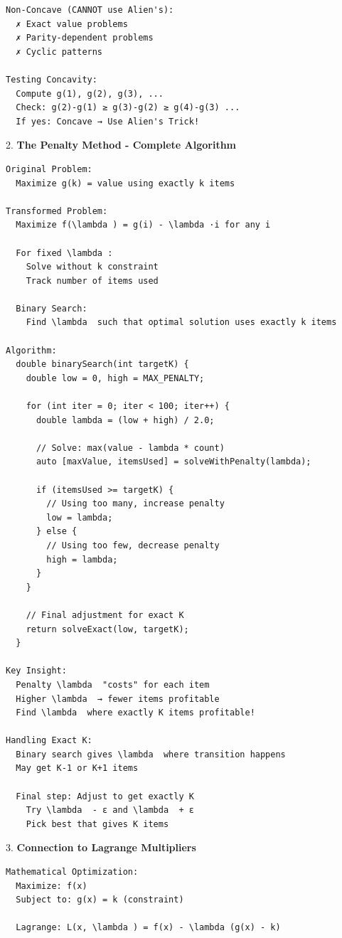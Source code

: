 \documentclass[11pt,a4paper,oneside]{book}
\begin{document}
\begin{tcolorbox}[
    enhanced,breakable,
    colback=white,
    colframe=deepblue,
    boxrule=1.5pt,
    arc=3mm,
    title=\textbf{The Ultimate DP Optimization}
]
\begin{verbatim}
Non-Concave (CANNOT use Alien's):
  ✗ Exact value problems
  ✗ Parity-dependent problems
  ✗ Cyclic patterns

Testing Concavity:
  Compute g(1), g(2), g(3), ...
  Check: g(2)-g(1) ≥ g(3)-g(2) ≥ g(4)-g(3) ...
  If yes: Concave → Use Alien's Trick!
\end{verbatim}

2. \textbf{The Penalty Method - Complete Algorithm}
\begin{verbatim}
Original Problem:
  Maximize g(k) = value using exactly k items

Transformed Problem:
  Maximize f(\lambda ) = g(i) - \lambda ·i for any i
  
  For fixed \lambda :
    Solve without k constraint
    Track number of items used
  
  Binary Search:
    Find \lambda  such that optimal solution uses exactly k items

Algorithm:
  double binarySearch(int targetK) {
    double low = 0, high = MAX_PENALTY;
    
    for (int iter = 0; iter < 100; iter++) {
      double lambda = (low + high) / 2.0;
      
      // Solve: max(value - lambda * count)
      auto [maxValue, itemsUsed] = solveWithPenalty(lambda);
      
      if (itemsUsed >= targetK) {
        // Using too many, increase penalty
        low = lambda;
      } else {
        // Using too few, decrease penalty
        high = lambda;
      }
    }
    
    // Final adjustment for exact K
    return solveExact(low, targetK);
  }

Key Insight:
  Penalty \lambda  "costs" for each item
  Higher \lambda  → fewer items profitable
  Find \lambda  where exactly K items profitable!

Handling Exact K:
  Binary search gives \lambda  where transition happens
  May get K-1 or K+1 items
  
  Final step: Adjust to get exactly K
    Try \lambda  - ε and \lambda  + ε
    Pick best that gives K items
\end{verbatim}

3. \textbf{Connection to Lagrange Multipliers}
\begin{verbatim}
Mathematical Optimization:
  Maximize: f(x)
  Subject to: g(x) = k (constraint)
  
  Lagrange: L(x, \lambda ) = f(x) - \lambda (g(x) - k)
  

\end{verbatim}
\end{tcolorbox}
\end{document}
